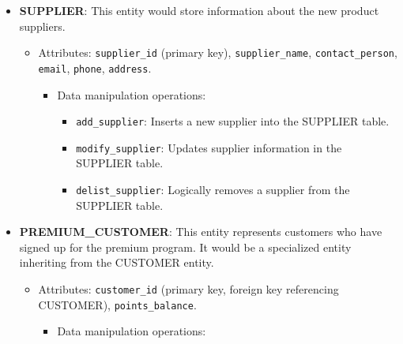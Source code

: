 \documentclass[
]{report}
\providecommand{\tightlist}{%
  \setlength{\itemsep}{0pt}\setlength{\parskip}{0pt}}\usepackage{longtable,booktabs,array}
\begin{document}
\begin{itemize}
\item
  \textbf{SUPPLIER}: This entity would store information about the new
  product suppliers.

  \begin{itemize}
  \item
    Attributes: \texttt{supplier\_id} (primary key),
    \texttt{supplier\_name}, \texttt{contact\_person}, \texttt{email},
    \texttt{phone}, \texttt{address}.

    \begin{itemize}
    \tightlist
    \item
      Data manipulation operations:

      \begin{itemize}
      \tightlist
      \item
        \texttt{add\_supplier}: Inserts a new supplier into the SUPPLIER
        table.
      \item
        \texttt{modify\_supplier}: Updates supplier information in the
        SUPPLIER table.
      \item
        \texttt{delist\_supplier}: Logically removes a supplier from the
        SUPPLIER table.
      \end{itemize}
    \end{itemize}
  \end{itemize}
\item
  \textbf{PREMIUM\_CUSTOMER}: This entity represents customers who have
  signed up for the premium program. It would be a specialized entity
  inheriting from the CUSTOMER entity.

  \begin{itemize}
  \item
    Attributes: \texttt{customer\_id} (primary key, foreign key
    referencing CUSTOMER), \texttt{points\_balance}.

    \begin{itemize}
    \item
      Data manipulation operations:


\end{itemize}
\end{itemize}
\end{itemize}
\end{document}
